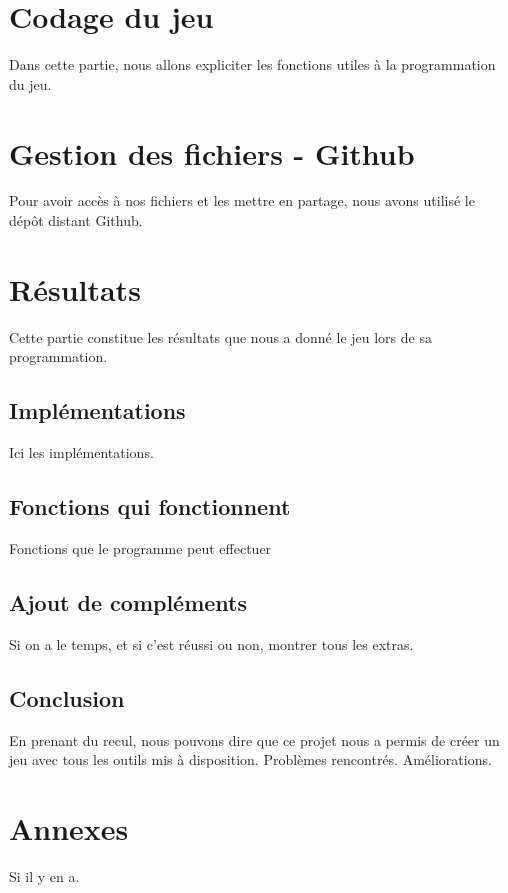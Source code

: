 \documentclass[a4paper,11pt]{report}
\begin{document}
\chapter{Codage du jeu}
Dans cette partie, nous allons expliciter les fonctions utiles à la programmation du jeu.
\chapter{Gestion des fichiers - Github}
Pour avoir accès à nos fichiers et les mettre en partage, nous avons utilisé le dépôt distant Github.
\chapter{Résultats}
Cette partie constitue les résultats que nous a donné le jeu lors de sa programmation.
\section{Implémentations}
Ici les implémentations.
\section{Fonctions qui fonctionnent}
Fonctions que le programme peut effectuer
\section{Ajout de compléments}
Si on a le temps, et si c'est réussi ou non, montrer tous les extras.
\section{Conclusion}
En prenant du recul, nous pouvons dire que ce projet nous a permis de créer un jeu avec tous les outils mis à disposition.
Problèmes rencontrés.
Améliorations.
\chapter{Annexes}
Si il y en a.
\end{document}
